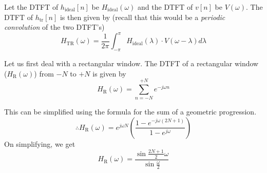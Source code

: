 \documentclass{article}
\theoremstyle{definition}
\newcommand\ddfrac[2]{\frac{\displaystyle #1}{\displaystyle #2}}
\begin{document}
Let the DTFT of $h_{\text{ideal}}[n]$ be $H_{\text{ideal}}(\omega)$ and the DTFT of $v[n]$ be $V(\omega)$. The DTFT of $h_{\text{tr}}[n]$ is then given by (recall that this would be a \textit{periodic convolution} of the two DTFT's)
\[
    H_{\text{TR}}(\omega) = \frac{1}{2\pi} \int_{-\pi}^{\pi} H_{\text{ideal}}(\lambda) \cdot V(\omega - \lambda) d\lambda
\]

Let us first deal with a rectangular window. The DTFT of a rectangular window ($H_{\text{R}}(\omega)$) from $-N$ to $+N$ is given by 
\[
    H_{\text{R}}(\omega) = \sum_{n = -N}^{+N} e^{-j \omega n}
\]

This can be simplified using the formula for the sum of a geometric progression.
\[
    \therefore H_{\text{R}}(\omega) = e^{j \omega N} \left( \ddfrac{1 - e^{-j\omega (2N+1)}}{1 - e^{j\omega}} \right)
\]
On simplifying, we get 
\[
    H_{\text{R}}(\omega) = \ddfrac{\sin \frac{2N+1}{2} \omega}{\sin \frac{\omega}{2}}
\]
\end{document}
